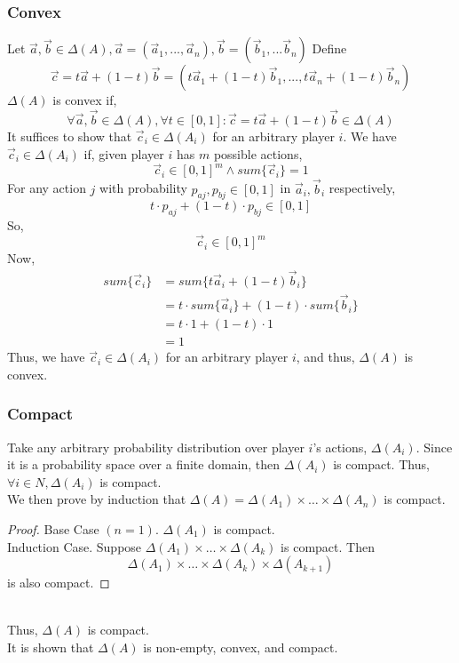 \subsubsection{Convex}
Let $\vec{a},\vec{b}\in \Delta(A), 
\vec{a}=(\vec{a}_1,...,\vec{a}_n),\vec{b}=(\vec{b}_1,...\vec{b}_n)$
Define 
\[\vec{c}=t\vec{a}+(1-t)\vec{b}
=(t\vec{a}_1+(1-t)\vec{b}_1,...,t\vec{a}_n+(1-t)\vec{b}_n)\]
$\Delta(A)$ is convex if,
\[\forall \vec{a},\vec{b}\in \Delta(A),
\forall t\in[0,1]:\vec{c}=t\vec{a}+(1-t)\vec{b}\in\Delta(A)\]
It suffices to show that $\vec{c}_i\in\Delta(A_i)$
for an arbitrary player $i$.
We have $\vec{c}_i\in\Delta(A_i)$ if, 
given player $i$ has $m$ possible actions,
\[\vec{c}_i\in[0,1]^m \wedge sum\{\vec{c}_i\}=1\]
For any action $j$ with probability 
$p_{aj},p_{bj}\in[0,1]$ in $\vec{a}_i,\vec{b}_i$ respectively,
\[t\cdot p_{aj} + (1-t) \cdot p_{bj} \in [0,1]\]
So,
\[\vec{c}_i\in[0,1]^m\]
Now,
\begin{equation}
\begin{aligned}
    sum\{\vec{c}_i\} &= sum\{t\vec{a}_i+(1-t)\vec{b}_i\}\\
    &= t\cdot sum\{\vec{a}_i\} + (1-t)\cdot sum\{\vec{b}_i\}\\
    &= t\cdot 1 + (1-t) \cdot 1\\
    &= 1
\end{aligned}
\end{equation}
Thus, we have $\vec{c}_i\in\Delta(A_i)$ for an arbitrary player $i$,
and thus, $\Delta(A)$ is convex.

\subsubsection{Compact}
Take any arbitrary probability distribution over player $i$'s actions,
$\Delta(A_i)$. Since it is a probability space over a finite domain,
then $\Delta(A_i)$ is compact. Thus, $\forall i\in N,\Delta(A_i)$ is compact.\\
We then prove by induction that 
$\Delta(A)=\Delta(A_1)\times\dots\times\Delta(A_n)$ is compact.\\
\begin{proof}
    Base Case $(n=1)$. $\Delta(A_1)$ is compact.\\
    Induction Case. Suppose $\Delta(A_1)\times\dots\times\Delta(A_k)$ is compact.
    Then 
    \[\Delta(A_1)\times\dots\times\Delta(A_k)\times\Delta(A_{k+1})\]
    is also compact.
\end{proof}\\
Thus, $\Delta(A)$ is compact.\\
It is shown that $\Delta(A)$ is non-empty, convex, and compact.

